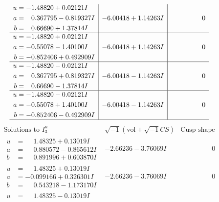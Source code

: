 \documentclass[1p]{elsarticle_modified}
\theoremstyle{definition}
\newcommand{\I}{\sqrt{-1}}
\begin{document}
$$\begin{array}{c|c|c}
\begin{aligned}
u &= -1.48820 + 0.02121 I \\
a &= \phantom{-}0.367795 - 0.819327 I \\
b &= \phantom{-}0.66690 + 1.37814 I\end{aligned}
 & -6.00418 + 1.14263 I & \phantom{-0.000000 } 0 \\ \hline\begin{aligned}
u &= -1.48820 + 0.02121 I \\
a &= -0.55078 - 1.40100 I \\
b &= -0.852406 + 0.492909 I\end{aligned}
 & -6.00418 + 1.14263 I & \phantom{-0.000000 } 0 \\ \hline\begin{aligned}
u &= -1.48820 - 0.02121 I \\
a &= \phantom{-}0.367795 + 0.819327 I \\
b &= \phantom{-}0.66690 - 1.37814 I\end{aligned}
 & -6.00418 - 1.14263 I & \phantom{-0.000000 } 0 \\ \hline\begin{aligned}
u &= -1.48820 - 0.02121 I \\
a &= -0.55078 + 1.40100 I \\
b &= -0.852406 - 0.492909 I\end{aligned}
 & -6.00418 - 1.14263 I & \phantom{-0.000000 } 0\\
 \hline 
 \end{array}$$\newpage$$\begin{array}{c|c|c}  
\text{Solutions to }I^u_{3}& \I (\text{vol} + \sqrt{-1}CS) & \text{Cusp shape}\\
 \hline 
\begin{aligned}
u &= \phantom{-}1.48325 + 0.13019 I \\
a &= \phantom{-}0.880572 - 0.865612 I \\
b &= \phantom{-}0.891996 + 0.603870 I\end{aligned}
 & -2.66236 - 3.76069 I & \phantom{-0.000000 } 0 \\ \hline\begin{aligned}
u &= \phantom{-}1.48325 + 0.13019 I \\
a &= -0.099166 + 0.326301 I \\
b &= \phantom{-}0.543218 - 1.173170 I\end{aligned}
 & -2.66236 - 3.76069 I & \phantom{-0.000000 } 0 \\ \hline\begin{aligned}
u &= \phantom{-}1.48325 - 0.13019 I \\

\end{aligned}
\end{array}$$
\end{document}
